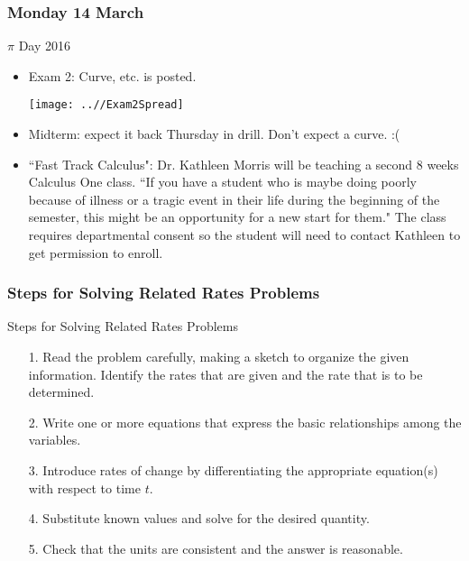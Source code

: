 \documentclass[cal1spr16Lectures.tex]{subfiles}
\begin{document}

\subsubsection{\bf Monday 14 March}

\begin{frame}[allowframebreaks]{$\pi$ Day 2016}
\begin{itemize}\footnotesize
\item Exam 2: Curve, etc. is posted. 

\begin{center}
\texttt{[image: ..//Exam2Spread]}
\end{center}
\framebreak
\item Midterm: expect it back Thursday in drill.  Don't expect a curve. :(
\item ``Fast Track Calculus": Dr. Kathleen Morris will be teaching a second 8 weeks Calculus One class.  ``If you have a student who is maybe doing poorly because of illness or a tragic event in their life during the beginning of the semester, this might be an opportunity for a new start for them."  The class requires departmental consent so the student will need to contact Kathleen to get permission to enroll.
\end{itemize}
\end{frame}

\subsubsection{Steps for Solving Related Rates Problems}

\begin{frame}{\small Steps for Solving Related Rates Problems}
\small
\begin{itemize}
\item[1.] Read the problem carefully, making a sketch to organize the given information.  Identify the rates that are given and the rate that is to be determined.
\item[2.] Write one or more equations that express the basic relationships among the variables.
\item[3.] Introduce rates of change by differentiating the appropriate equation(s) with respect to time $t$.
\item[4.] Substitute known values and solve for the desired quantity.
\item[5.] Check that the units are consistent and the answer is reasonable.
\end{itemize}
\end{frame}
\end{document}
